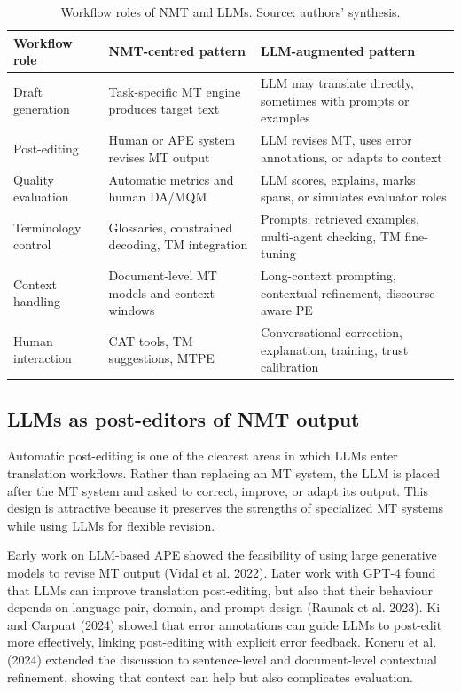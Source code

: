\documentclass[11pt]{article}
\begin{document}
\begin{table}[t]
\centering
\caption{Workflow roles of NMT and LLMs. Source: authors' synthesis.}
\small
\begin{tabularx}{\textwidth}{>{\RaggedRight\arraybackslash}p{2.7cm}>{\RaggedRight\arraybackslash}X>{\RaggedRight\arraybackslash}X}
\toprule
Workflow role & NMT-centred pattern & LLM-augmented pattern \\
\midrule
Draft generation & Task-specific MT engine produces target text & LLM may translate directly, sometimes with prompts or examples \\
Post-editing & Human or APE system revises MT output & LLM revises MT, uses error annotations, or adapts to context \\
Quality evaluation & Automatic metrics and human DA/MQM & LLM scores, explains, marks spans, or simulates evaluator roles \\
Terminology control & Glossaries, constrained decoding, TM integration & Prompts, retrieved examples, multi-agent checking, TM fine-tuning \\
Context handling & Document-level MT models and context windows & Long-context prompting, contextual refinement, discourse-aware PE \\
Human interaction & CAT tools, TM suggestions, MTPE & Conversational correction, explanation, training, trust calibration \\
\bottomrule
\end{tabularx}
\end{table}

\subsection{LLMs as post-editors of NMT output}
Automatic post-editing is one of the clearest areas in which LLMs enter translation workflows. Rather than replacing an MT system, the LLM is placed after the MT system and asked to correct, improve, or adapt its output. This design is attractive because it preserves the strengths of specialized MT systems while using LLMs for flexible revision.

Early work on LLM-based APE showed the feasibility of using large generative models to revise MT output (Vidal et al. 2022). Later work with GPT-4 found that LLMs can improve translation post-editing, but also that their behaviour depends on language pair, domain, and prompt design (Raunak et al. 2023). Ki and Carpuat (2024) showed that error annotations can guide LLMs to post-edit more effectively, linking post-editing with explicit error feedback. Koneru et al. (2024) extended the discussion to sentence-level and document-level contextual refinement, showing that context can help but also complicates evaluation.
\end{document}

